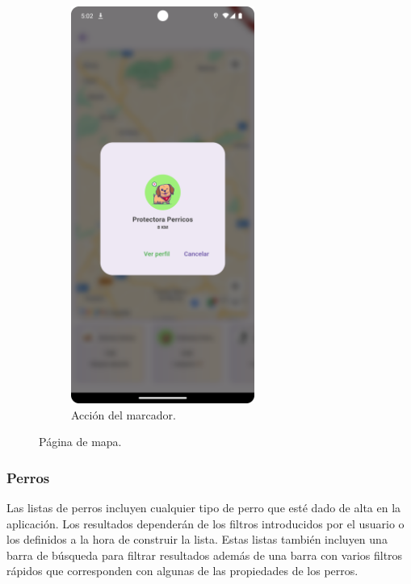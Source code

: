 \documentclass[a4paper, 12pt]{article}
\begin{document}
\begin{figure}[H]
\begin{subfigure}{0.48\textwidth}
\begin{center}
			{\includegraphics[width=6cm]{app/MarkerClick.png}\par}
			\caption{Acción del marcador.}
		\end{center}  
	\end{subfigure}\hfill
	\caption{Página de mapa.}
\end{figure}

\newpage
\subsubsection*{Perros}

Las listas de perros incluyen cualquier tipo de perro que esté dado de alta en la aplicación. Los resultados dependerán de los filtros introducidos por el usuario o los definidos a la hora de construir la lista. Estas listas también incluyen una barra de búsqueda para filtrar resultados además de una barra con varios filtros rápidos que corresponden con algunas de las propiedades de los perros.
\end{document}
